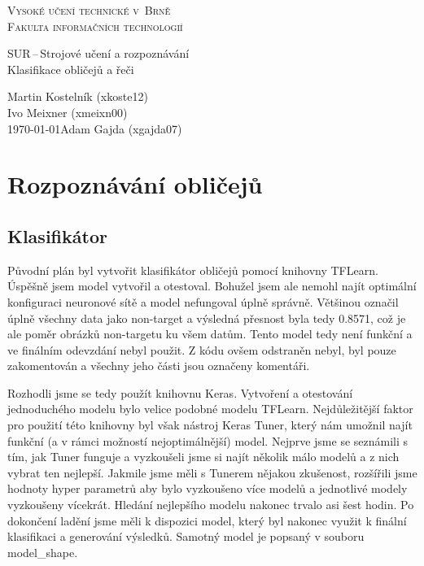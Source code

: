 \documentclass[a4paper,11pt]{article}
\begin{document}
	\begin{titlepage}
		\begin{center}
			\textsc{\Huge Vysoké učení technické v~Brně\\
				\vspace{0.4em}\huge Fakulta informačních technologií}
			
			
			{\LARGE SUR\,--\,Strojové učení a rozpoznávání\\
				\Huge Klasifikace obličejů a řeči\\ \vspace{0.3em}}
			
			
			{\Large \hfill Martin Kostelník (xkoste12)}\\
			{\Large \hfill Ivo Meixner (xmeixn00)}\\
			{\Large \today \hfill Adam Gajda (xgajda07)}
		\end{center}
	\end{titlepage}

	\section{Rozpoznávání obličejů}
		\subsection{Klasifikátor}
			Původní plán byl vytvořit klasifikátor obličejů pomocí knihovny TFLearn. Úspěšně jsem model vytvořil a otestoval. Bohužel jsem ale nemohl najít optimální konfiguraci neuronové sítě a model nefungoval úplně správně. Většinou označil úplně všechny data jako non-target a výsledná přesnost byla tedy 0.8571, což je ale poměr obrázků non-targetu ku všem datům. Tento model tedy není funkční a ve finálním odevzdání nebyl použit. Z kódu ovšem odstraněn nebyl, byl pouze zakomentován a všechny jeho části jsou označeny komentáři.
			
			\vspace{10pt}
			
			Rozhodli jsme se tedy použít knihovnu Keras. Vytvoření a otestování jednoduchého modelu bylo velice podobné modelu TFLearn. Nejdůležitější faktor pro použití této knihovny byl však nástroj Keras Tuner, který nám umožnil najít funkční (a v rámci možností nejoptimálnější) model. Nejprve jsme se seznámili s tím, jak Tuner funguje a vyzkoušeli jsme si najít několik málo modelů a z nich vybrat ten nejlepší. Jakmile jsme měli s Tunerem nějakou zkušenost, rozšířili jsme hodnoty hyper parametrů aby bylo vyzkoušeno více modelů a jednotlivé modely vyzkoušeny vícekrát. Hledání nejlepšího modelu nakonec trvalo asi šest hodin. Po dokončení ladění jsme měli k dispozici model, který byl nakonec využit k finální klasifikaci a generování výsledků. Samotný model je popsaný v souboru model\_shape.
			
\end{document}
